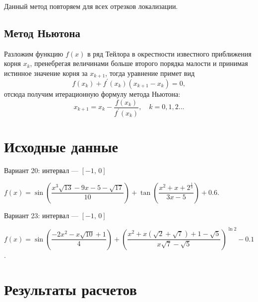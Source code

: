 \documentclass[12pt, a4paper]{article}
\begin{document}
Данный метод повторяем для всех отрезков локализации. 

\subsection{Метод Ньютона}

Разложим функцию $f(x)$ в ряд Тейлора в окрестности известного приближения корня $x_k$, пренебрегая величинами больше второго порядка малости и принимая истинное значение корня за $x_{k+1}$, тогда уравнение примет вид
\[
f(x_k) + f^'(x_k)(x_{k+1} - x_k) = 0,
\]
отсюда получим итерационную формулу метода Ньютона:
\[
x_{k+1} = x_k - \dfrac{f(x_k)}{f^'(x_k)}, \quad k=0,1,2...
\]


\section{Исходные данные}

Вариант 20: интервал --- $[-1,\, 0]$
 
$f(x) = \sin\left(\dfrac{x^3\sqrt{13} - 9x - 5 - \sqrt{17}}{10}\right) + \tan\left({\dfrac{x^2 + x + 2^{\frac{1}{3}}}{3x - 5}}\right) + 0{.}6$.

Вариант 23: интервал --- $[-1,\, 0]$
         
$f(x) = \sin\left(\dfrac{-2x^2 - x\sqrt{10} + 1}{4}\right)+ \left(\dfrac{x^2+x(\sqrt{2}+ \sqrt{7}) + 1 - \sqrt{5}}{x\sqrt{7} - \sqrt{5}}\right)^{\ln{2}}  - 0{.}1$.

\section{Результаты расчетов}
\end{document}
